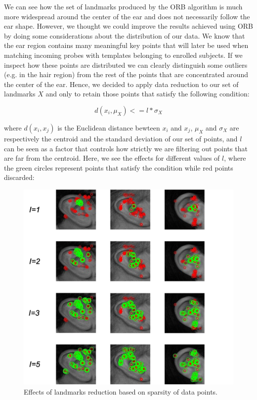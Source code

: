 \documentclass{article}
\begin{document}
We can see how the set of landmarks produced by the ORB algorithm is much more widespread around the
center of the ear and does not necessarily follow the ear shape. However, we thought we could improve the
results achieved using ORB by doing some considerations about the distribution of our data. We know that the ear
region contains many meaningful key points that will later be used when matching incoming probes with templates
belonging to enrolled subjects. If we inspect how these points are distributed we can clearly distinguish some
outliers (e.g. in the hair region) from the rest of the points that are concentrated around the center of the ear.
Hence, we decided to apply data reduction to our set of landmarks $X$ and only to retain those points that
satisfy the following condition:

$$ d(x_i, \mu_X) <= l * \sigma_X $$

where $d(x_i,x_j)$ is the Euclidean distance bewteen $x_i$ and $x_j$, $\mu_X$ and $\sigma_X$ are respectively the
centroid and the standard deviation of our set of points, and $l$ can be seen as a factor that controls how strictly
we are filtering out points that are far from the centroid. Here, we see the effects for different values of $l$,
where the green circles represent points that satisfy the condition while red points discarded:

\begin{figure}[h]
    \begin{center}
        \includegraphics[width=14cm,keepaspectratio]{images/landmark_orb_reduced.png}
        \caption{Effects of landmarks reduction based on sparsity of data points.}
    \end{center}
\end{figure}
\end{document}
